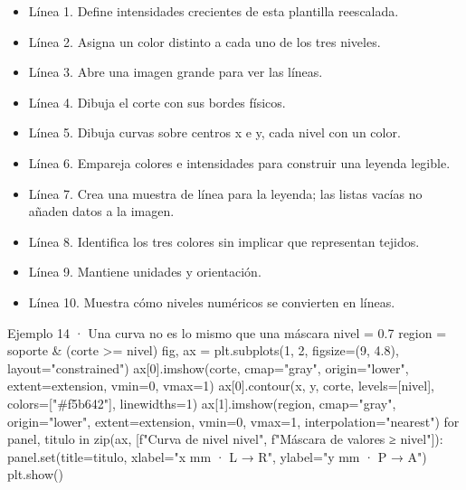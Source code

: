 
\begin{itemize}

\item Línea 1. Define intensidades crecientes de esta plantilla reescalada.

\item Línea 2. Asigna un color distinto a cada uno de los tres niveles.

\item Línea 3. Abre una imagen grande para ver las líneas.

\item Línea 4. Dibuja el corte con sus bordes físicos.

\item Línea 5. Dibuja curvas sobre centros x e y, cada nivel con un color.

\item Línea 6. Empareja colores e intensidades para construir una leyenda legible.

\item Línea 7. Crea una muestra de línea para la leyenda; las listas vacías no añaden datos a la imagen.

\item Línea 8. Identifica los tres colores sin implicar que representan tejidos.

\item Línea 9. Mantiene unidades y orientación.

\item Línea 10. Muestra cómo niveles numéricos se convierten en líneas.

\end{itemize}

\begin{Codigo}{Ejemplo 14 · Una curva no es lo mismo que una máscara}
nivel = 0.7
region = soporte & (corte >= nivel)
fig, ax = plt.subplots(1, 2, figsize=(9, 4.8), layout="constrained")
ax[0].imshow(corte, cmap="gray", origin="lower", extent=extension, vmin=0, vmax=1)
ax[0].contour(x, y, corte, levels=[nivel], colors=["#f5b642"], linewidths=1)
ax[1].imshow(region, cmap="gray", origin="lower", extent=extension, vmin=0, vmax=1, interpolation="nearest")
for panel, titulo in zip(ax, [f"Curva de nivel {nivel}", f"Máscara de valores ≥ {nivel}"]):
    panel.set(title=titulo, xlabel="x mm · L → R", ylabel="y mm · P → A")
plt.show()
\end{Codigo}



